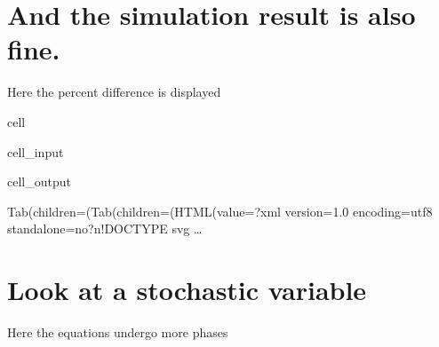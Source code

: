 \documentclass[letterpaper,10pt,english]{jupyterBook}
\begin{document}
\section{And the simulation result is also fine.}
\label{\detokenize{content/howto/onboard/eviews/onboard one model from  wf1:and-the-simulation-result-is-also-fine}}
\sphinxAtStartPar
Here the percent difference is displayed

\begin{sphinxuseclass}{cell}\begin{sphinxVerbatimInput}

\begin{sphinxuseclass}{cell_input}
\begin{sphinxVerbatim}[commandchars=\\\{\}]
\PYG{p}{[}\PYG{p}{]}
\end{sphinxVerbatim}

\end{sphinxuseclass}\end{sphinxVerbatimInput}
\begin{sphinxVerbatimOutput}

\begin{sphinxuseclass}{cell_output}
\begin{sphinxVerbatim}[commandchars=\\\{\}]
Tab(children=(Tab(children=(HTML(value=\PYGZsq{}\PYGZlt{}?xml version=\PYGZdq{}1.0\PYGZdq{} encoding=\PYGZdq{}utf\PYGZhy{}8\PYGZdq{} standalone=\PYGZdq{}no\PYGZdq{}?\PYGZgt{}\PYGZbs{}n\PYGZlt{}!DOCTYPE svg …
\end{sphinxVerbatim}

\begin{sphinxVerbatim}[commandchars=\\\{\}]

\end{sphinxVerbatim}

\end{sphinxuseclass}\end{sphinxVerbatimOutput}

\end{sphinxuseclass}

\section{Look at a stochastic variable}
\label{\detokenize{content/howto/onboard/eviews/onboard one model from  wf1:look-at-a-stochastic-variable}}
\sphinxAtStartPar
Here the equations undergo more phases
\end{document}
